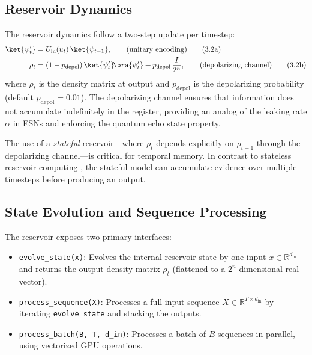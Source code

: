 
\subsection{Reservoir Dynamics}

The reservoir dynamics follow a two-step update per timestep:
\begin{subequations}
\label{eq:reservoir_update}
\begin{align}
\ket{\psi'_t} &= U_{\mathrm{in}}(u_t) \, \ket{\psi_{t-1}}, \qquad
\text{(unitary encoding)} \tag{3.2a} \\
\rho_t &= (1 - p_{\mathrm{depol}}) \, \ket{\psi'_t}\!\bra{\psi'_t}
          + p_{\mathrm{depol}} \, \frac{I}{2^n},
          \qquad \text{(depolarizing channel)} \tag{3.2b}
\end{align}
\end{subequations}
where $\rho_t$ is the density matrix at output and $p_{\mathrm{depol}}$
is the depolarizing probability (default $p_{\mathrm{depol}} = 0.01$).
The depolarizing channel ensures that information does not accumulate
indefinitely in the register, providing an analog of the leaking rate
$\alpha$ in ESNs and enforcing the quantum echo state property.


The use of a \emph{stateful} reservoir—where $\rho_t$ depends explicitly
on $\rho_{t-1}$ through the depolarizing channel—is critical for
temporal memory. In contrast to stateless reservoir computing
\citep{torre2023memory}, the stateful model can accumulate evidence
over multiple timesteps before producing an output.


\subsection{State Evolution and Sequence Processing}

The reservoir exposes two primary interfaces:

\begin{itemize}
  \item \verb|evolve_state(x)|: Evolves the internal reservoir state by one
    input $x \in \mathbb{R}^{d_{\mathrm{in}}}$ and returns the output
    density matrix $\rho_t$ (flattened to a $2^n$-dimensional real vector).
  \item \verb|process_sequence(X)|: Processes a full input sequence
    $X \in \mathbb{R}^{T \times d_{\mathrm{in}}}$ by iterating
    \verb|evolve_state| and stacking the outputs.
  \item \verb|process_batch(B, T, d_in)|: Processes a batch of $B$ sequences
    in parallel, using vectorized GPU operations.
\end{itemize}

